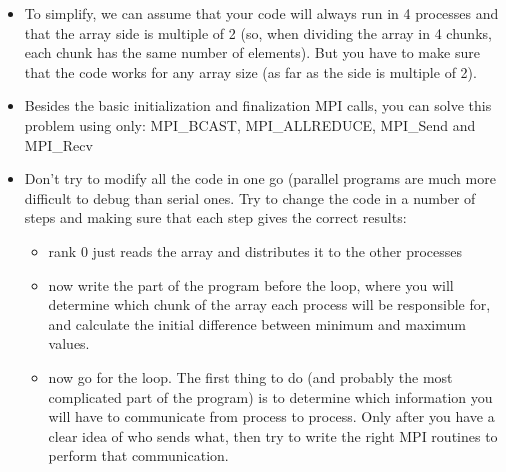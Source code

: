 \begin{itemize}
\item To simplify, we can assume that your code will always run in 4 processes
  and that the array side is multiple of 2 (so, when dividing the array in 4
  chunks, each chunk has the same number of elements). But you have to make sure
  that the code works for any array size (as far as the side is multiple of 2).
\item Besides the basic initialization and finalization MPI calls, you can solve
  this problem using only: MPI\_BCAST, MPI\_ALLREDUCE, MPI\_Send and MPI\_Recv
\item Don't try to modify all the code in one go (parallel programs are much
  more difficult to debug than serial ones. Try to change the code in a number
  of steps and making sure that each step gives the correct results:
\begin{itemize}
\item rank 0 just reads the array and distributes it to the other processes
\item now write the part of the program before the loop, where you will
  determine which chunk of the array each process will be responsible for, and
  calculate the initial difference between minimum and maximum values.
\item now go for the loop. The first thing to do (and probably the most
  complicated part of the program) is to determine which information you will
  have to communicate from process to process. Only after you have a clear idea
  of who sends what, then try to write the right MPI routines to perform that communication.
\end{itemize}
\end{itemize}
